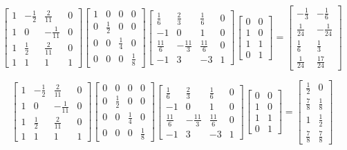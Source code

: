 \documentclass[12pt,a4paper]{article}
\begin{document}
$$
\begin{bmatrix}
1&-\frac{1}{2}&\frac{2}{11}&0\\ 
1&0&-\frac{1}{11}&0\\
1&\frac{1}{2}&\frac{2}{11}&0\\
1&1&1&1
\end{bmatrix}
\begin{bmatrix}
1 & 0 & 0 & 0\\
0 & \frac{1}{2} & 0 & 0\\
0 & 0 & \frac{1}{4} & 0\\
0 & 0 & 0 & \frac{1}{8}
\end{bmatrix}
\begin{bmatrix}\frac{1}{6}&\frac{2}{3}&\frac{1}{6}&0\\ -1&0&1&0\\ \frac{11}{6}&-\frac{11}{3}&\frac{11}{6}&0\\ -1&3&-3&1\end{bmatrix}
{\begin{bmatrix}0&0\\ 1&0\\ 1&1\\ 0&1\end{bmatrix}}=
\begin{bmatrix}-\frac{1}{3}&-\frac{1}{6}\\ \frac{1}{24}&-\frac{1}{24}\\ \frac{1}{6}&\frac{1}{3}\\ \frac{1}{24}&\frac{17}{24}\end{bmatrix}
$$

$$
\begin{bmatrix}
1&-\frac{1}{2}&\frac{2}{11}&0\\ 
1&0&-\frac{1}{11}&0\\
1&\frac{1}{2}&\frac{2}{11}&0\\
1&1&1&1
\end{bmatrix}
\begin{bmatrix}
0 & 0 & 0 & 0\\
0 & \frac{1}{2} & 0 & 0\\
0 & 0 & \frac{1}{4} & 0\\
0 & 0 & 0 & \frac{1}{8}
\end{bmatrix}
\begin{bmatrix}\frac{1}{6}&\frac{2}{3}&\frac{1}{6}&0\\ -1&0&1&0\\ \frac{11}{6}&-\frac{11}{3}&\frac{11}{6}&0\\ -1&3&-3&1\end{bmatrix}
{\begin{bmatrix}0&0\\ 1&0\\ 1&1\\ 0&1\end{bmatrix}}=
\begin{bmatrix}\frac{1}{2}&0\\ \frac{7}{8}&\frac{1}{8}\\ 1&\frac{1}{2}\\ \frac{7}{8}&\frac{7}{8}\end{bmatrix}
$$
\end{document}
